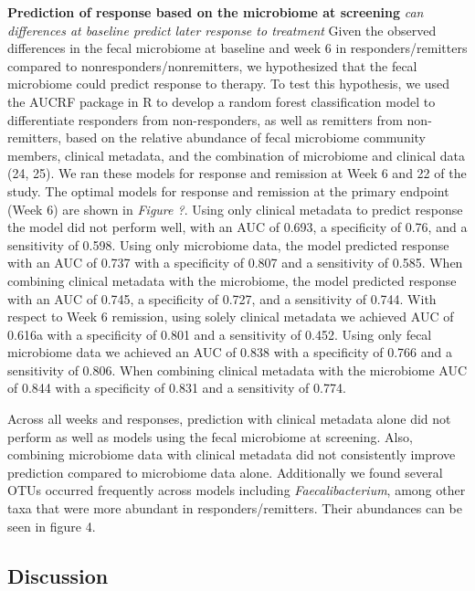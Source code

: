 \documentclass[11pt,]{article}
\begin{document}
\textbf{Prediction of response based on the microbiome at screening}
\emph{can differences at baseline predict later response to treatment}
Given the observed differences in the fecal microbiome at baseline and
week 6 in responders/remitters compared to nonresponders/nonremitters,
we hypothesized that the fecal microbiome could predict response to
therapy. To test this hypothesis, we used the AUCRF package in R to
develop a random forest classification model to differentiate responders
from non-responders, as well as remitters from non-remitters, based on
the relative abundance of fecal microbiome community members, clinical
metadata, and the combination of microbiome and clinical data (24, 25).
We ran these models for response and remission at Week 6 and 22 of the
study. The optimal models for response and remission at the primary
endpoint (Week 6) are shown in \emph{Figure ?}. Using only clinical
metadata to predict response the model did not perform well, with an AUC
of 0.693, a specificity of 0.76, and a sensitivity of 0.598. Using only
microbiome data, the model predicted response with an AUC of 0.737 with
a specificity of 0.807 and a sensitivity of 0.585. When combining
clinical metadata with the microbiome, the model predicted response with
an AUC of 0.745, a specificity of 0.727, and a sensitivity of 0.744.
With respect to Week 6 remission, using solely clinical metadata we
achieved AUC of 0.616a with a specificity of 0.801 and a sensitivity of
0.452. Using only fecal microbiome data we achieved an AUC of 0.838 with
a specificity of 0.766 and a sensitivity of 0.806. When combining
clinical metadata with the microbiome AUC of 0.844 with a specificity of
0.831 and a sensitivity of 0.774.

Across all weeks and responses, prediction with clinical metadata alone
did not perform as well as models using the fecal microbiome at
screening. Also, combining microbiome data with clinical metadata did
not consistently improve prediction compared to microbiome data alone.
Additionally we found several OTUs occurred frequently across models
including \emph{Faecalibacterium}, among other taxa that were more
abundant in responders/remitters. Their abundances can be seen in figure
4.

\subsection{Discussion}\label{discussion}
\end{document}
